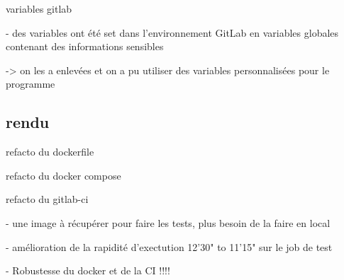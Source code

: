 variables gitlab

- des variables ont été set dans l'environnement GitLab en variables globales contenant des informations sensibles

-> on les a enlevées et on a pu utiliser des variables personnalisées pour le programme

\subsection{rendu}
refacto du dockerfile

refacto du docker compose

refacto du gitlab-ci
    
- une image à récupérer pour faire les tests, plus besoin de la faire en local

- amélioration de la rapidité d'exectution 12'30" to 11'15" sur le job de test

- Robustesse du docker et de la CI !!!!
